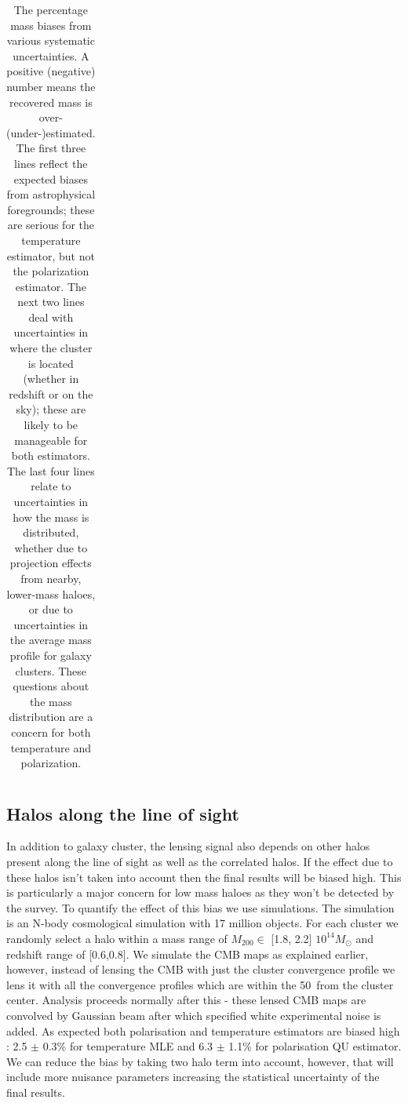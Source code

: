 \begin {table}[ht]
\begin{tabular}{| l | c  | c | c | c |}
 \end{tabular}
\vspace*{2mm}
\caption{The percentage mass biases from various systematic uncertainties. A positive (negative) number means the recovered mass is over- (under-)estimated. The first three lines reflect the expected biases from astrophysical foregrounds; these are serious for the temperature estimator, but not the polarization estimator. The next two lines deal with uncertainties in where the cluster is located (whether in redshift or on the sky); these are likely to be manageable for both estimators. The last four lines relate to uncertainties in how the mass is distributed, whether due to projection effects from nearby, lower-mass haloes, or due to uncertainties in the average mass profile for galaxy clusters. These questions about the mass distribution are a concern for both temperature and polarization. }
\label{tab_sys_bias}
\vspace*{2mm}
\end{table}
 \subsection{Halos along the line of sight}
 In addition to galaxy cluster, the lensing signal also depends on other halos present along the line of sight as well as the correlated halos. 
 If the effect due to these halos isn't taken into account then the final results will be biased high. 
 This is particularly a major concern for low mass haloes as they won't be detected by the survey.
 To quantify the effect of this bias we use \cite{flender16} simulations. 
 The \cite{flender16} simulation is an N-body cosmological simulation with 17 million objects.
  For each cluster we randomly select a halo within a mass range of  $M_{200} \in$ [1.8, 2.2] $10^{14} M_{\odot}$ and redshift range of [0.6,0.8].
We simulate the CMB maps as explained earlier, however, instead of lensing the CMB with just the cluster convergence profile we lens it with all the convergence profiles which are within the 50\am\ from the cluster center. 
Analysis proceeds normally after this - these lensed CMB maps are convolved by Gaussian beam after which specified white experimental noise is added. 
As expected both polarisation and temperature estimators are biased high : 2.5 $\pm$ 0.3\% for temperature MLE and 6.3 $\pm$ 1.1\% for polarisation QU estimator. We can reduce the bias by taking two halo term into account, however, that will include more nuisance parameters increasing the statistical uncertainty of the final results. 


